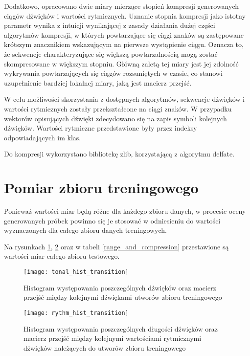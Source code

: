 {{        Dodatkowo, opracowano dwie miary mierzące stopień kompresji generowanych ciągów dźwięków i\,\,wartości rytmicznych. 
        Uznanie stopnia kompresji jako istotny parametr wynika z\,\,intuicji wynikającej z\,\,zasady działania dużej części
        algorytmów kompresji, w\,\,których powtarzające się ciągi znaków są zastępowane krótszym znacznikiem wskazującym na pierwsze 
        wystąpienie ciągu. 
        Oznacza to, że sekwencje charakteryzujące się większą powtarzalnością mogą zostać skompresowane w\,\,większym stopniu.
        Główną zaletą tej miary jest jej zdolność wykrywania powtarzających się ciągów rozsuniętych w\,\,czasie, co stanowi uzupełnienie 
        bardziej lokalnej miary, jaką jest macierz przejść.

        W\,\,celu możliwości skorzystania z\,\,dostępnych algorytmów, sekwencje dźwięków i\,\,wartości rytmicznych zostały przekształcone
        na ciągi znaków. W\,\,przypadku wektorów opisujących dźwięki zdecydowano się na zapis symboli kolejnych dźwięków. Wartości
        rytmiczne przedstawione były przez indeksy odpowiadających im klas. 

        Do kompresji wykorzystano bibliotekę zlib, korzystającą z\,\,algorytmu delfate.
    }

    \section{Pomiar zbioru treningowego}
    {
        Ponieważ wartości miar będą różne dla każdego zbioru danych, w\,\,procesie oceny generowanych próbek powinno się je 
        stosować w\,\,odniesieniu do wartości wyznaczonych dla całego zbioru danych treningowych. 
        
        Na rysunkach \ref{tonal_hist_transition}, \ref{rythm_hist_transition} oraz w\,\,tabeli \ref{range_and_compression} 
        przestawione są wartości miar całego zbioru testowego.

        \begin{figure}
            \centering
            \texttt{[image: tonal\_hist\_transition]}
            \caption{Histogram występowania poszczególnych dźwięków oraz macierz przejść między kolejnymi dźwiękami utworów zbioru treningowego}
            \label{tonal_hist_transition}
        \end{figure}

        \begin{figure}
            \centering
            \texttt{[image: rythm\_hist\_transition]}
            \caption{Histogram występowania poszczególnych długości dźwięków oraz macierz przejść między kolejnymi wartościami rytmicznymi dźwięków należących do utworów zbioru treningowego}
            \label{rythm_hist_transition}
        \end{figure}

}}
